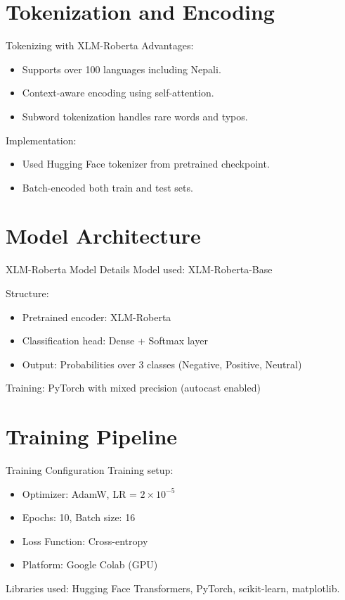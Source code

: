\documentclass[aspectratio=169]{beamer}
\begin{document}
\section{Tokenization and Encoding}
\begin{frame}{Tokenizing with XLM-Roberta}
  Advantages:
  \begin{itemize}
    \item Supports over 100 languages including Nepali.
    \item Context-aware encoding using self-attention.
    \item Subword tokenization handles rare words and typos.
  \end{itemize}

  Implementation:
  \begin{itemize}
    \item Used Hugging Face tokenizer from pretrained checkpoint.
    \item Batch-encoded both train and test sets.
  \end{itemize}
\end{frame}

\section{Model Architecture}
\begin{frame}{XLM-Roberta Model Details}
  Model used: XLM-Roberta-Base

  Structure:
  \begin{itemize}
    \item Pretrained encoder: XLM-Roberta
    \item Classification head: Dense + Softmax layer
    \item Output: Probabilities over 3 classes (Negative, Positive, Neutral)
  \end{itemize}

  Training: PyTorch with mixed precision (autocast enabled)
\end{frame}

\section{Training Pipeline}
\begin{frame}{Training Configuration}
  Training setup:
  \begin{itemize}
    \item Optimizer: AdamW, LR = \(2\times10^{-5}\)
    \item Epochs: 10, Batch size: 16
    \item Loss Function: Cross-entropy
    \item Platform: Google Colab (GPU)
  \end{itemize}

  Libraries used:
  Hugging Face Transformers, PyTorch, scikit-learn, matplotlib.
\end{frame}
\end{document}
